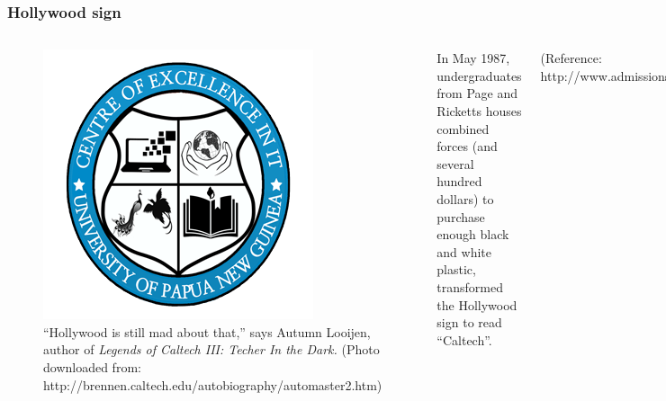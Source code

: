 \documentclass[hyperref={bookmarks=false},aspectratio=169]{beamer}
\begin{document}
\begin{frame}
\frametitle{Hollywood sign}

\begin{columns}


\begin{figure}
    \centering
    \includegraphics[width=\columnwidth]{images/CEIT_Logo_300X300.png}
    \caption{``Hollywood is still mad about that,'' says Autumn Looijen, author of \emph{Legends of Caltech III: Techer In the Dark.} \tiny{(Photo downloaded from: http://brennen.caltech.edu/autobiography/automaster2.htm)}}
    \label{fig:hollywood_prank}
\end{figure}


In May 1987, undergraduates from Page and Ricketts houses combined forces (and several hundred dollars) to purchase enough black and white plastic, transformed the Hollywood sign to read ``Caltech''.

\small{(Reference: http://www.admissions.caltech.edu/pranks)}

\end{columns}
\end{frame}
\end{document}

